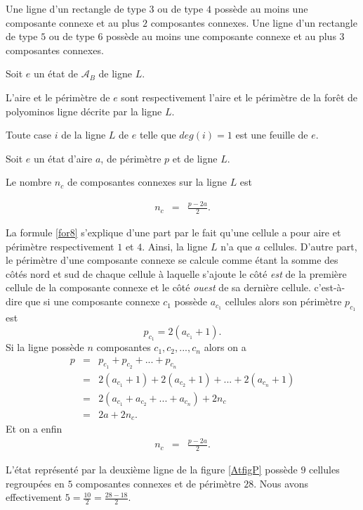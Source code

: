 \begin{Ex}\label{ex11}
Une ligne d'un rectangle de type $3$ ou de type $4$ possède au moins une composante connexe et au plus $2$ composantes connexes.
Une ligne d'un rectangle de type  $5$ ou de type  $6$ possède au moins une composante connexe et au plus $3$ composantes connexes.
\end{Ex}
\begin{Def}\label{def42023}
Soit $e$ un état de $\mathcal{A}_{B}$ de ligne $L$.

 L'aire et le périmètre de $e$ sont respectivement l'aire et le périmètre de la forêt de polyominos ligne décrite par la ligne $L$.
 
Toute case $i$ de la ligne $L$ de  $e$ telle que $deg(i)=1$ est une feuille de $e$.
\end{Def}
\begin{Prop}\label{prop12}
Soit $e$ un état d'aire $a$, de périmètre $p$ et de ligne $L$. 

Le nombre $n_{c}$ de composantes connexes sur la ligne $L$ est 

\begin{eqnarray}\label{for8}
 n_{c} & = & \frac{p-2a}{2}.
\end{eqnarray}
\end{Prop}
\begin{Pre}
La formule \ref{for8} s'explique d'une part par le fait qu'une cellule a pour aire et périmètre respectivement $1$ et $4$. Ainsi, la ligne $L$ n'a que $a$ cellules. D'autre part,  le périmètre d'une composante connexe se calcule comme étant la somme des côtés nord et sud de chaque cellule à laquelle s'ajoute le côté \emph{est} de la première cellule de la composante  connexe et le côté \emph{ouest} de sa dernière cellule. c'est-à-dire que si une composante connexe $c_{1}$ possède $a_{c_{1}}$ cellules alors son périmètre $p_{c_{1}}$ est 
$$p_{c_{1}} = 2(a_{c_{1}} + 1).$$  Si la ligne possède $n$ composantes $c_{1}, c_{2},..., c_{n} $ alors on a 
\begin{eqnarray*}
p &= & p_{c_{1}} +  p_{c_{2}} + ... + p_{c_{n}}\\
& = & 2(a_{c_{1}} + 1) + 2(a_{c_{2}} + 1) +...+ 2(a_{c_{n}} + 1)\\
&=& 2(a_{c_{1}}+ a_{c_{2}} +...+a_{c_{n}}) + 2n_{c}\\
&=& 2a+2n_{c}.
\end{eqnarray*} 
Et on a  enfin
\begin{eqnarray*}
n_{c} & = & \frac{p-2a}{2}.
\end{eqnarray*}
\end{Pre}
\begin{Ex}\label{ex13}
L'état  représenté par la deuxième ligne de la figure \ref{AtfigP}  possède $9$ cellules regroupées en $5$ composantes connexes et de périmètre $28$. Nous avons effectivement $5=\frac{10}{2}=\frac{28-18}{2}.$
\end{Ex}

